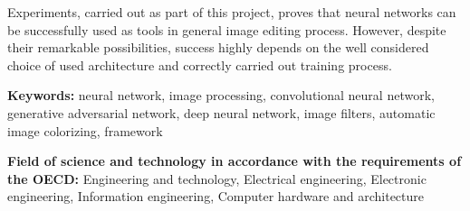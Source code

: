   Experiments, carried out as part of this project, proves that neural networks can
  be successfully used as tools in general image editing process. However, despite
  their remarkable possibilities, success highly depends on the well considered choice of used architecture
  and correctly carried out training process.

  \bigskip

  \noindent\textbf{Keywords:} neural network, image processing, convolutional
  neural network, generative adversarial network, deep neural network,
  image filters, automatic image colorizing, framework

  \bigskip

  \noindent\textbf{Field of science and technology in accordance with the
  requirements of the OECD:} Engineering and technology, Electrical engineering,
  Electronic engineering, Information engineering, Computer hardware and
  architecture
